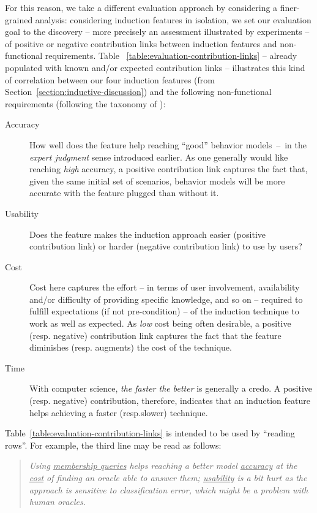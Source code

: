 For this reason, we take a different evaluation approach by considering a finer-grained analysis: considering induction features in isolation, we set our evaluation goal to the discovery -- more precisely an assessment illustrated by experiments -- of positive or negative contribution links between induction features and non-functional requirements. Table ~\ref{table:evaluation-contribution-links} -- already populated with known and/or expected contribution links -- illustrates this kind of correlation between our four induction features (from Section~\ref{section:inductive-discussion}) and the following non-functional requirements (following the taxonomy of \cite{VanLamsweerde:2009}):

\begin{description}
\item[Accuracy] How well does the feature help reaching ``good'' behavior models~--~in the \emph{expert judgment} sense introduced earlier. As one generally would like reaching \emph{high} accuracy, a positive contribution link captures the fact that, given the same initial set of scenarios, behavior models will be more accurate with the feature plugged than without it. 
\item[Usability] Does the feature makes the induction approach easier (positive contribution link) or harder (negative contribution link) to use by users?
\item[Cost] Cost here captures the effort -- in terms of user involvement, availability and/or difficulty of providing specific knowledge, and so on -- required to fulfill expectations (if not pre-condition) -- of the induction technique to work as well as expected. As \emph{low} cost being often desirable, a positive (resp. negative) contribution link captures the fact that the feature diminishes (resp. augments) the cost of the technique.
\item[Time] With computer science, \emph{the faster the better} is generally a credo. A positive (resp. negative) contribution, therefore, indicates that an induction feature helps achieving a faster (resp.slower) technique.
\end{description}

Table~\ref{table:evaluation-contribution-links} is intended to be used by ``reading rows''. For example, the third line may be read as follows:

\begin{quote}\emph{Using \underline{membership queries} helps reaching a better model \underline{accuracy} at the \underline{cost} of finding an oracle able to answer them; \underline{usability} is a bit hurt as the approach is sensitive to classification error, which might be a problem with human oracles.}\end{quote}

